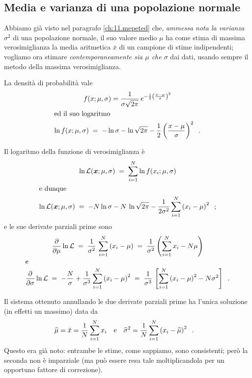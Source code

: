 \subsection{Media e varianza di una popolazione
  normale}
Abbiamo gi\`a visto nel paragrafo \ref{ch:11.mepeted} che,
\emph{ammessa nota la varianza} $\sigma^2$ di una
popolazione normale, il suo valore medio $\mu$ ha come stima
di massima verosimiglianza la media aritmetica $\bar x$ di
un campione di stime indipendenti; vogliamo ora stimare
\emph{contemporaneamente sia $\mu$ che $\sigma$} dai dati,
usando sempre il metodo della massima verosimiglianza.

La densit\`a di probabilit\`a vale
\begin{gather*}
  f( x; \mu, \sigma ) = \frac{1}{\sigma \sqrt{2 \pi}} \,
    e^{- \frac{1}{2} \left( \frac{x - \mu}{
          \sigma } \right)^2 } \\
  \intertext{ed il suo logaritmo}
  \ln f ( x; \mu, \sigma ) \; = \; - \ln \sigma - \ln \sqrt{
    2 \pi } - \frac{1}{2} \left( \frac{x - \mu}{ \sigma }
    \right)^2 \;\; .
\end{gather*}

Il logaritmo della funzione di verosimiglianza \`e
\begin{gather*}
  \ln \mathcal{L} ( \boldsymbol{x}; \mu, \sigma) \; =
    \; \sum_{i=1}^N \ln f ( x_i ; \mu, \sigma ) \\
  \intertext{e dunque}
  \ln \mathcal{L} ( \boldsymbol{x}; \mu, \sigma) \; = \; - N
    \ln \sigma - N \, \ln \sqrt{2 \pi} - \frac{1}{2 \sigma^2}
    \sum_{i=1}^N \left( x_i - \mu \right)^2 \;\; ;
\end{gather*}
e le sue derivate parziali prime sono
\begin{gather*}
  \frac{ \partial }{ \partial \mu } \ln \mathcal{L} \; = \;
    \frac{1}{\sigma^2} \, \sum_{i=1}^N \left( x_i - \mu
    \right) \; = \; \frac{1}{ \sigma^2 } \left(
  \sum\limits_{i=1}^N x_i - N \mu \right) \\
  \intertext{e}
  \frac{ \partial }{ \partial \sigma } \ln \mathcal{L} \; =
    \; - \frac{N}{\sigma} + \frac{1}{\sigma^3} \sum_{i=1}^N
    \left( x_i - \mu \right)^2 \; = \; \frac{1}{\sigma^3} \,
    \left[ \sum_{i=1}^N \left( x_i - \mu \right)^2 - N
    \sigma^2  \right] \;\; .
\end{gather*}

Il sistema ottenuto annullando le due derivate parziali
prime ha l'unica soluzione (in effetti un massimo) data da
\begin{align*}
  \widehat \mu &= \bar x = \frac{1}{N} \sum_{i=1}^N x_i
   &&\text{e} &
   \widehat \sigma^2 &= \frac{1}{N} \sum_{i=1}^N \left( x_i
     - \widehat \mu \right)^2 \;\; .
\end{align*}
Questo era gi\`a noto: entrambe le stime, come sappiamo,
sono consistenti; per\`o la seconda non \`e imparziale (ma
pu\`o essere resa tale moltiplicandola per un opportuno
fattore di correzione).

